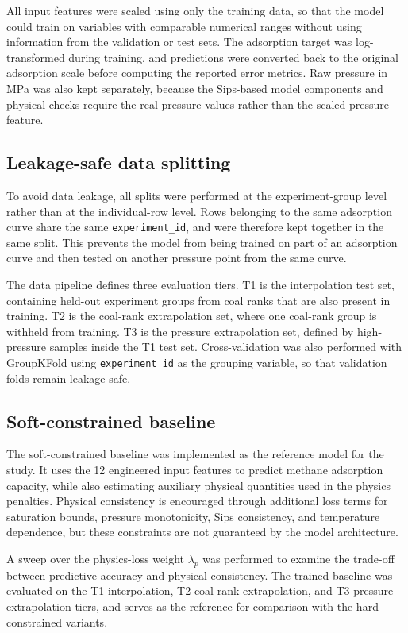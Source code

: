 \documentclass[11pt]{article}
\begin{document}
All input features were scaled using only the training data, so that the model
could train on variables with comparable numerical ranges without using
information from the validation or test sets. The adsorption target was
log-transformed during training, and predictions were converted back to the
original adsorption scale before computing the reported error metrics. Raw
pressure in MPa was also kept separately, because the Sips-based model
components and physical checks require the real pressure values rather than the
scaled pressure feature.

\subsection{Leakage-safe data splitting}

To avoid data leakage, all splits were performed at the experiment-group level
rather than at the individual-row level. Rows belonging to the same adsorption
curve share the same \texttt{experiment\_id}, and were therefore kept together
in the same split. This prevents the model from being trained on part of an
adsorption curve and then tested on another pressure point from the same curve.

The data pipeline defines three evaluation tiers. T1 is the interpolation test
set, containing held-out experiment groups from coal ranks that are also present
in training. T2 is the coal-rank extrapolation set, where one coal-rank group is
withheld from training. T3 is the pressure extrapolation set, defined by
high-pressure samples inside the T1 test set. Cross-validation was also
performed with GroupKFold using \texttt{experiment\_id} as the grouping
variable, so that validation folds remain leakage-safe.

\subsection{Soft-constrained baseline}
The soft-constrained baseline was implemented as the reference model for the
study. It uses the 12 engineered input features to predict methane adsorption
capacity, while also estimating auxiliary physical quantities used in the
physics penalties. Physical consistency is encouraged through additional loss
terms for saturation bounds, pressure monotonicity, Sips consistency, and
temperature dependence, but these constraints are not guaranteed by the model
architecture.

A sweep over the physics-loss weight \(\lambda_p\) was performed
to examine the trade-off between predictive accuracy and physical consistency.
The trained baseline was evaluated on the T1 interpolation, T2 coal-rank
extrapolation, and T3 pressure-extrapolation tiers, and serves as the reference
for comparison with the hard-constrained variants.
\end{document}
